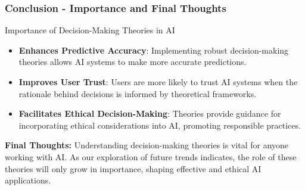\documentclass[aspectratio=169]{beamer}
\begin{document}
\begin{frame}[fragile]
    \frametitle{Conclusion - Importance and Final Thoughts}

    \begin{block}{Importance of Decision-Making Theories in AI}
        \begin{itemize}
            \item \textbf{Enhances Predictive Accuracy}: Implementing robust decision-making theories allows AI systems to make more accurate predictions.
            \item \textbf{Improves User Trust}: Users are more likely to trust AI systems when the rationale behind decisions is informed by theoretical frameworks.
            \item \textbf{Facilitates Ethical Decision-Making}: Theories provide guidance for incorporating ethical considerations into AI, promoting responsible practices.
        \end{itemize}
    \end{block}

    \textbf{Final Thoughts:} Understanding decision-making theories is vital for anyone working with AI. As our exploration of future trends indicates, the role of these theories will only grow in importance, shaping effective and ethical AI applications.
    
\end{frame}
\end{document}
